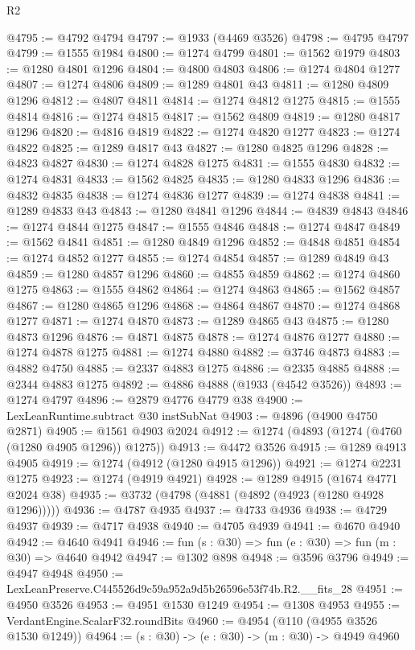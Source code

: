 \begin{lexlean}{R2}
\begin{coremodule}
@4795 := @4792 @4794
@4797 := @1933 (@4469 @3526)
@4798 := @4795 @4797
@4799 := @1555 @1984
@4800 := @1274 @4799
@4801 := @1562 @1979
@4803 := @1280 @4801 @1296
@4804 := @4800 @4803
@4806 := @1274 @4804 @1277
@4807 := @1274 @4806
@4809 := @1289 @4801 @43
@4811 := @1280 @4809 @1296
@4812 := @4807 @4811
@4814 := @1274 @4812 @1275
@4815 := @1555 @4814
@4816 := @1274 @4815
@4817 := @1562 @4809
@4819 := @1280 @4817 @1296
@4820 := @4816 @4819
@4822 := @1274 @4820 @1277
@4823 := @1274 @4822
@4825 := @1289 @4817 @43
@4827 := @1280 @4825 @1296
@4828 := @4823 @4827
@4830 := @1274 @4828 @1275
@4831 := @1555 @4830
@4832 := @1274 @4831
@4833 := @1562 @4825
@4835 := @1280 @4833 @1296
@4836 := @4832 @4835
@4838 := @1274 @4836 @1277
@4839 := @1274 @4838
@4841 := @1289 @4833 @43
@4843 := @1280 @4841 @1296
@4844 := @4839 @4843
@4846 := @1274 @4844 @1275
@4847 := @1555 @4846
@4848 := @1274 @4847
@4849 := @1562 @4841
@4851 := @1280 @4849 @1296
@4852 := @4848 @4851
@4854 := @1274 @4852 @1277
@4855 := @1274 @4854
@4857 := @1289 @4849 @43
@4859 := @1280 @4857 @1296
@4860 := @4855 @4859
@4862 := @1274 @4860 @1275
@4863 := @1555 @4862
@4864 := @1274 @4863
@4865 := @1562 @4857
@4867 := @1280 @4865 @1296
@4868 := @4864 @4867
@4870 := @1274 @4868 @1277
@4871 := @1274 @4870
@4873 := @1289 @4865 @43
@4875 := @1280 @4873 @1296
@4876 := @4871 @4875
@4878 := @1274 @4876 @1277
@4880 := @1274 @4878 @1275
@4881 := @1274 @4880
@4882 := @3746 @4873
@4883 := @4882 @4750
@4885 := @2337 @4883 @1275
@4886 := @2335 @4885
@4888 := @2344 @4883 @1275
@4892 := @4886 @4888 (@1933 (@4542 @3526))
@4893 := @1274 @4797
@4896 := @2879 @4776 @4779 @38
@4900 := LexLeanRuntime.subtract @30 instSubNat
@4903 := @4896 (@4900 @4750 @2871)
@4905 := @1561 @4903 @2024
@4912 := @1274 (@4893 (@1274 (@4760 (@1280 @4905 @1296)) @1275))
@4913 := @4472 @3526
@4915 := @1289 @4913 @4905
@4919 := @1274 (@4912 (@1280 @4915 @1296))
@4921 := @1274 @2231 @1275
@4923 := @1274 (@4919 @4921)
@4928 := @1289 @4915 (@1674 @4771 @2024 @38)
@4935 := @3732 (@4798 (@4881 (@4892 (@4923 (@1280 @4928 @1296)))))
@4936 := @4787 @4935
@4937 := @4733 @4936
@4938 := @4729 @4937
@4939 := @4717 @4938
@4940 := @4705 @4939
@4941 := @4670 @4940
@4942 := @4640 @4941
@4946 := fun (s : @30) => fun (e : @30) => fun (m : @30) => @4640 @4942
@4947 := @1302 @898
@4948 := @3596 @3796
@4949 := @4947 @4948
@4950 := LexLeanPreserve.C445526d9c59a952a9d5b26596e53f74b.R2.__fits_28
@4951 := @4950 @3526
@4953 := @4951 @1530 @1249
@4954 := @1308 @4953
@4955 := VerdantEngine.ScalarF32.roundBits
@4960 := @4954 (@110 (@4955 @3526 @1530 @1249))
@4964 := (s : @30) -> (e : @30) -> (m : @30) -> @4949 @4960

\end{coremodule}
\end{lexlean}
